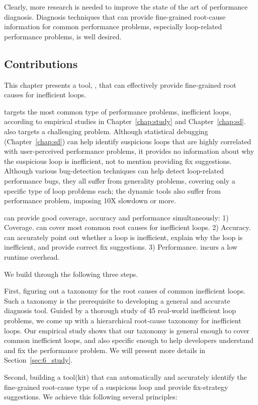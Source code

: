 Clearly, more research is needed to improve the state of the art of performance
diagnosis. Diagnosis techniques that can provide fine-grained root-cause information for common performance problems,
especially loop-related performance problems, is well desired.

\subsection{Contributions}
This chapter presents a tool, \Tool, that can effectively provide fine-grained root causes for inefficient loops. 

\Tool targets the most common type of performance problems, 
inefficient loops, according to
empirical studies in Chapter~\ref{chap:study} and Chapter~\ref{chap:sd}.
\Tool also targets a challenging problem. Although
statistical debugging (Chapter~\ref{chap:sd})
can help identify suspicious loops that are highly correlated with 
user-perceived performance problems,
it provides no information about why the suspicious loop is inefficient,
not to mention providing fix suggestions. Although various
bug-detection techniques \citep{Cachetor,Alabama,CARAMEL} can help detect
loop-related performance bugs, they all suffer from generality problems,
covering only a specific type of loop problems each; the dynamic
tools \citep{Cachetor,Alabama} also suffer from performance
problem, imposing 10X slowdown or more.

\Tool can provide good coverage, accuracy and performance simultaneously:
1) Coverage. \Tool can cover most common root causes for inefficient loops. 
2) Accuracy. \Tool can accurately point out whether a loop is inefficient, explain why the loop is inefficient, 
and provide correct fix suggestions. 
3) Performance. \Tool incurs a low runtime overhead.

We build \Tool through the following three steps.

First, figuring out a taxonomy for the root causes of common inefficient loops.
Such a taxonomy is the prerequisite to developing a general and accurate
diagnosis tool. Guided by a thorough study of 45 real-world inefficient loop problems, we come up with a hierarchical root-cause taxonomy for
inefficient loops. 
Our empirical study shows that our taxonomy is general enough to cover
common inefficient loops, and also specific enough to help developers understand
and fix the performance problem. We will present more details 
in Section~\ref{sec:6_study}.

Second, building a tool(kit) \Tool that can automatically and accurately
identify the fine-grained root-cause type of a suspicious loop 
and provide fix-strategy suggestions. 
We achieve this following several principles:

